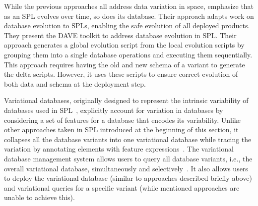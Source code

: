 While the previous approaches all address data variation in space,
\citet{dbSPLevolve} emphasize that as an SPL evolves over time, so does its
database. Their approach adapts work on database evolution to SPLs, enabling
the safe evolution of all deployed products.
%
 They present the DAVE toolkit to address database evolution in SPL. Their
 approach generates a global evolution script from the local evolution scripts
 by grouping them into a single database operations and executing them
 sequentially. This approach requires having the old and new schema of a
 variant to generate the delta scripts. However, it uses these scripts to
 ensure correct evolution of both data and schema at the deployment step. 

 Variational databases, originally designed to represent the intrinsic
 variability of databases used in SPL~\cite{ATW18poly}, explicitly account for
 variation in databases by considering a set of features for a database that
 encodes its variability. Unlike other approaches taken in SPL introduced at
 the beginning of this section, it collapses all the database variants into
 one variational database while tracing the variation by annotating elements
 with feature expressions~\cite{ATW17dbpl}. The variational database
 management system allows users to query all database variants, i.e., the
 overall variational database, simultaneously and
 selectively~\cite{vldbArXiv}. It also allows users to deploy the variational
 database (similar to approaches described briefly above) and variational
 queries for a specific variant (while mentioned approaches are unable to
 achieve this).